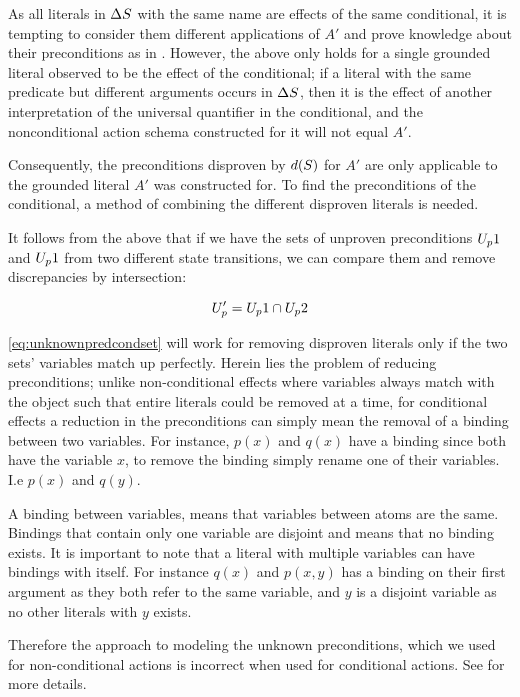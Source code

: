 \documentclass[\master/Master.tex]{subfiles}
\begin{document}
As all literals in $\Delta S$ with the same name are effects of the same conditional, it is tempting to consider them different applications of $A'$ and prove knowledge about their preconditions as in . However, the above only holds for a single grounded literal observed to be the effect of the conditional; if a literal with the same predicate but different arguments occurs in $\Delta S$, then it is the effect of another interpretation of the universal quantifier in the conditional, and the nonconditional action schema constructed for it will not equal $A'$.

Consequently, the preconditions disproven by $d(S)$ for $A'$ are only applicable to the grounded literal $A'$ was constructed for. To find the preconditions of the conditional, a method of combining the different disproven literals is needed.

It follows from the above that if we have the sets of unproven preconditions $U_p1$ and $U_p1$ from two different state transitions, we can compare them and remove discrepancies by intersection:

\begin{equation}
\label{eq:unknownpredcondset}
	U_p' = U_p1 \cap U_p2
\end{equation}

\eqref{eq:unknownpredcondset} will work for removing  disproven literals only if the two sets' variables match up perfectly. Herein lies the problem of reducing preconditions; unlike non-conditional effects where variables always match with the object such that entire literals could be removed at a time, for conditional effects a reduction in the preconditions can simply mean the removal of a binding between two variables. For instance, $p(x)$ and $q(x)$ have a binding since both have the variable $x$, to remove the binding simply rename one of their variables. I.e $p(x)$ and $q(y)$.

\begin{definition}[Binding]\label{def:ca:binding}
    A binding between variables, means that variables between atoms are the same.
	Bindings that contain only one variable are disjoint and means that no binding exists.
	It is important to note that a literal with multiple variables can have bindings with itself.
	For instance $q(x)$ and $p(x,y)$ has a binding on their first argument as they both refer to the same variable, and $y$ is a disjoint variable as no other literals with $y$ exists.
\end{definition}
Therefore the approach to modeling the unknown preconditions, which we used for non-conditional actions is incorrect when used for conditional actions. See  for more details.
\end{document}
